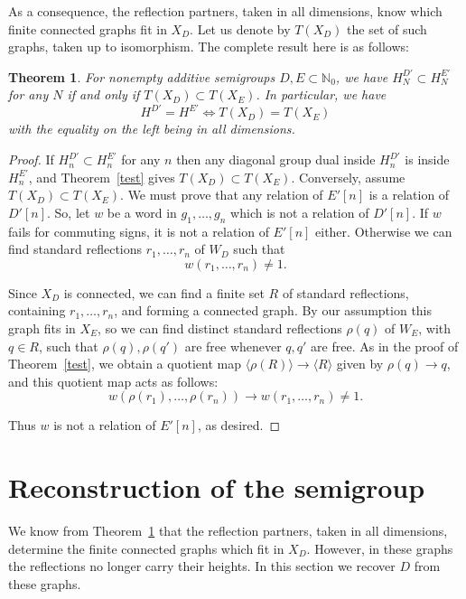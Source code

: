 \documentclass[11pt,a4paper]{article}
\newtheorem{thm}{Theorem}[section]
\begin{document}
As a consequence, the reflection partners, taken in all dimensions, know which finite connected graphs fit in $X_D$. Let us denote by $T(X_D)$ the set of such graphs, taken up to isomorphism. The complete result here is as follows:

\begin{thm}\label{order}
For nonempty additive semigroups $D,E\subset\mathbb N_0$, we have $H_N^{D'}\subset H_N^{E'}$ for any $N$ if and only if $T(X_D)\subset T(X_E)$. In particular, we have
\[
 H^{D'}=H^{E'}\iff T(X_D)=T(X_E)
\]
with the equality on the left being in all dimensions.
\end{thm}

\begin{proof}
If $H_n^{D'}\subset H_n^{E'}$ for any $n$ then any diagonal group dual inside $H_n^{D'}$ is inside $H_n^{E'}$, and Theorem~\ref{test} gives $T(X_D)\subset T(X_E)$. Conversely, assume $T(X_D)\subset T(X_E)$. We must prove that any relation of $E'[n]$ is a relation of $D'[n]$. So, let $w$ be a word in $g_1,\ldots,g_n$ which is not a relation of $D'[n]$. If $w$ fails for commuting signs, it is not a relation of $E'[n]$ either. Otherwise we can find standard reflections $r_1,\ldots,r_n$ of $W_D$ such that
\[
 w(r_1,\ldots,r_n)\neq1.
\]

Since $X_D$ is connected, we can find a finite set $R$ of standard reflections, containing $r_1,\ldots,r_n$, and forming a connected graph. By our assumption this graph fits in $X_E$, so we can find distinct standard reflections $\rho(q)$ of $W_E$, with $q\in R$, such that $\rho(q),\rho(q')$ are free whenever $q,q'$ are free. As in the proof of Theorem~\ref{test}, we obtain a quotient map $\langle\rho(R)\rangle\to\langle R\rangle$ given by $\rho(q)\to q$, and this quotient map acts as follows:
\[
 w(\rho(r_1),\ldots,\rho(r_n))\to w(r_1,\ldots,r_n)\neq1.
\]

Thus $w$ is not a relation of $E'[n]$, as desired.
\end{proof}

\section{Reconstruction of the semigroup}\label{recover}

We know from Theorem~\ref{order} that the reflection partners, taken in all dimensions, determine the finite connected graphs which fit in $X_D$. However, in these graphs the reflections no longer carry their heights. In this section we recover $D$ from these graphs.
\end{document}
